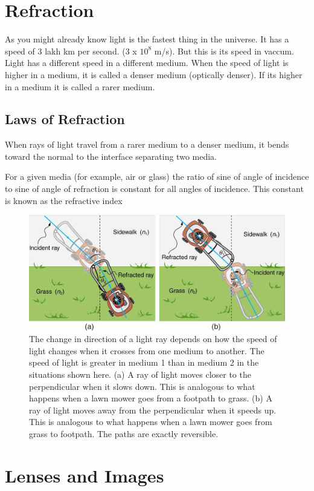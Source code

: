 \documentclass[12pt]{book}
\begin{document}
\section{Refraction}
As you might already know light is the fastest thing in the universe. It has a speed of 3 lakh km per second. (3 x $10^{8}$ m/s). But this is its speed in vaccum.
Light has a different speed in a  different medium. When the speed of light is higher in a medium, it is called a denser medium (optically denser). If its higher in a medium it is called a rarer medium.
\subsection*{Laws of Refraction}

When rays of light travel from a rarer medium to a denser medium,
it bends toward the normal to the interface separating two media.

For a given media (for example, air or glass) the ratio of sine of angle of incidence to sine of angle of refraction is constant
for all angles of incidence. This constant is known as the refractive index
\begin{figure}[htpb]
    \centering
    \includegraphics[width=0.8\linewidth]{../bending_light.jpeg}
    \caption{The change in direction of a light ray depends on how the speed of light changes when it crosses from one medium to another. The speed of light is greater in medium 1 than in medium 2 in the situations shown here. (a) A ray of light moves closer to the perpendicular when it slows down. This is analogous to what happens when a lawn mower goes from a footpath to grass. (b) A ray of light moves away from the perpendicular when it speeds up. This is analogous to what happens when a lawn mower goes from grass to footpath. The paths are exactly reversible.}%
    \label{fig:}
\end{figure}
\section{Lenses and Images}
\end{document}
